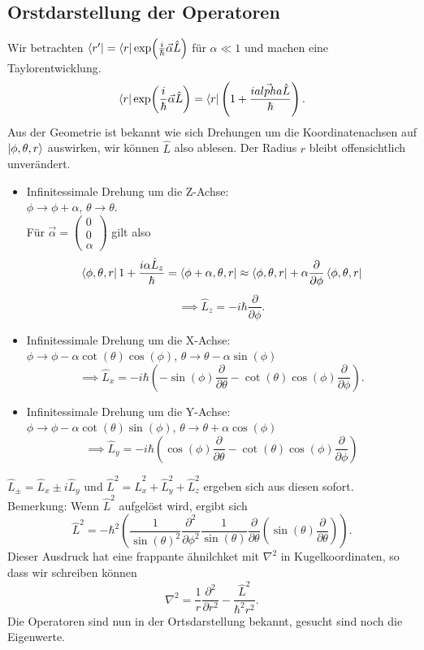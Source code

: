 \documentclass{report}
\begin{document}
\subsection{Orstdarstellung der Operatoren}
Wir betrachten $\bra{r'} = \bra{r} \exp(\frac{i}{\hbar } \vec{\alpha} \hat{L}) $ für $\alpha \ll 1$ und machen eine Taylorentwicklung. \[
\bra{r} \exp(\frac{i}{\hbar } \vec{\alpha} \hat{L}) = \bra{r} \left( 1 + \frac{i\vec{alpha}\hat{L}}{\hbar } \right) 
.\]  Aus der Geometrie ist bekannt wie sich Drehungen um die Koordinatenachsen auf $\ket{\phi, \theta, r} $ auswirken, wir können $\hat{L}$ also ablesen. Der Radius $r$ bleibt offensichtlich unverändert.
\begin{itemize}
	\item Infinitessimale Drehung um die Z-Achse: \\
		$\phi \to \phi + \alpha$, $\theta \to  \theta$.\\
		Für $\vec{\alpha} = \begin{pmatrix} 0 \\ 0 \\ \alpha \end{pmatrix} $ gilt also \[
		\bra{\phi, \theta, r} 1 + \frac{i\alpha \hat{L}_z}{\hbar } = \bra{\phi + \alpha, \theta, r} \approx \bra{\phi, \theta, r} + \alpha \frac{\partial}{\partial \phi} \bra{\phi, \theta, r} 
		\] \[
		\implies \hat{L}_z = -i\hbar \frac{\partial}{\partial \phi }
		.\] 
	\item Infinitessimale Drehung um die X-Achse: \\
		$\phi \to  \phi - \alpha \cot(\theta)\cos(\phi)$, $\theta \to  \theta - \alpha \sin(\phi)$ \[
			\implies \hat{L}_x = -i\hbar \left( -\sin(\phi) \frac{\partial}{\partial \theta} - \cot(\theta)\cos(\phi) \frac{\partial}{\partial \phi} \right) 
		.\] 
	\item Infinitessimale Drehung um die Y-Achse: \\
		$\phi \to  \phi - \alpha \cot(\theta)\sin(\phi)$, $\theta \to  \theta + \alpha \cos(\phi)$ \[
			\implies \hat{L}_y = -i\hbar \left( \cos(\phi) \frac{\partial}{\partial \theta} - \cot(\theta)\cos(\phi) \frac{\partial}{\partial \phi} \right) 
		\]
\end{itemize}
$\hat{L}_{\pm} = \hat{L}_x \pm i \hat{L}_y$ und $\hat{L}^2 = \hat{L}_x^2 + \hat{L}_y^2 + \hat{L}_z^2$ ergeben sich aus diesen sofort. \\
Bemerkung:
Wenn $\hat{L}^2$ aufgelöst wird, ergibt sich \[
	\hat{L}^2 = -\hbar^2 \left( \frac{1}{\sin(\theta)^2}\frac{\partial^2}{\partial \phi^2} \frac{1}{\sin(\theta)}\frac{\partial}{\partial \theta}\left( \sin(\theta) \frac{\partial}{\partial \theta} \right)  \right)  
.\] Dieser Ausdruck hat eine frappante ähnilchket mit $\nabla^2$ in Kugelkoordinaten, so dass wir schreiben können \[
\nabla ^2 = \frac{1}{r} \frac{\partial^2}{\partial r^2} - \frac{\hat{L}^2}{\hbar^2r^2}
.\] Die Operatoren sind nun in der Ortsdarstellung bekannt, gesucht sind noch die Eigenwerte. 
\end{document}
